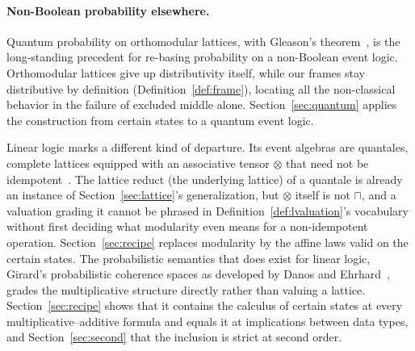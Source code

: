 \paragraph{Non-Boolean probability elsewhere.}
Quantum probability on orthomodular lattices, with Gleason's
theorem~\cite{birkhoff-vonneumann1936,gleason1957}, is the
long-standing precedent for re-basing probability on a non-Boolean
event logic.  Orthomodular lattices give up distributivity itself,
while our frames stay distributive by definition
(Definition~\ref{def:frame}), locating all the non-classical
behavior in the failure of excluded middle alone.
Section~\ref{sec:quantum} applies the construction from certain states
to a quantum event logic.  



Linear logic
marks a different kind of departure.  Its event algebras are
quantales, complete lattices equipped with an associative tensor
$\otimes$ that need not be idempotent~\cite{girard1987}.  The
lattice reduct (the underlying lattice) of a quantale is already an instance of
Section~\ref{sec:lattice}'s generalization, but $\otimes$ itself is
not $\sqcap$, and a valuation grading it cannot be phrased in
Definition~\ref{def:lvaluation}'s vocabulary without first deciding
what modularity even means for a non-idempotent operation.
Section~\ref{sec:recipe} replaces modularity by the affine laws valid on
the certain states.  The probabilistic semantics that does exist for
linear logic, Girard's probabilistic coherence spaces as developed by
Danos and Ehrhard~\cite{danos-ehrhard2011}, grades the multiplicative
structure directly rather than valuing a lattice.
Section~\ref{sec:recipe} shows that it contains the calculus of
certain states at every multiplicative--additive formula and equals it
at implications between data types, and Section~\ref{sec:second} that
the inclusion is strict at second order.  



